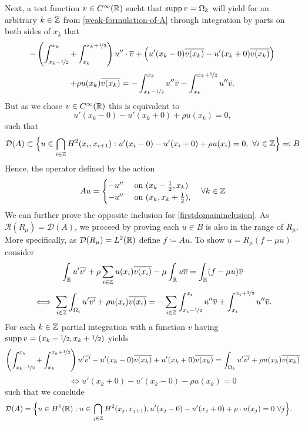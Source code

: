 Next, a test function $v \in C^{\infty}(\mathbb{R})$ sucht that $\operatorname{supp} v = \Omega_{k}$ will yield for an arbitrary $k \in \mathbb{Z}$ from \eqref{weak-formulation-of-A}   through integration by parts on both sides of $x_{k}$ that
	\[ -\left( \int_{x_{k}-\nicefrac{1}{2}}^{x_{k}} + \int_{x_{k}}^{x_{k} + \nicefrac{1}{2}}\right) u'' \cdot \overline{v} + \left( u'(x_{k}-0) \overline{v(x_{k})} - u'(x_{k} + 0) \overline{v(x_{k})} \right) \\ \]
	\[ +  \rho u(x_{k})\overline{v(x_{k})} = - \int_{x_{k} - \nicefrac{1}{2}}^{x_{k}} u'' \overline{v} - \int_{x_{k}}^{x_{k} + \nicefrac{1}{2}} u'' \overline{v}. \]
But as we chose $v \in C^{\infty}(\mathbb{R})$ this is equivalent to
	\[ u'(x_{k}-0) - u'(x_{k}+0) + \rho u(x_{k}) = 0, \]
such that
	\begin{equation}
		\mathcal{D}(A) \subset \Big\{ u \in \bigcap_{i \in \mathbb{Z}} H^{2}(x_{i}, x_{i + 1}) : u'(x_{i} - 0) - u'(x_{i} + 0) + \rho u(x_{i}) = 0 , ~\forall i \in \mathbb{Z} \Big\} \eqqcolon B \label{firstdomaininclusion}
	\end{equation} 
Hence, the operator defined by the action
	\[ A u = \begin{cases}
					- u'' & \text{ on } (x_{k} - \frac{1}{2}, x_{k}) \\
					- u'' & \text{ on } (x_{k}, x_{k} + \frac{1}{2}),
			 \end{cases} \quad \forall k \in \mathbb{Z} \] %
We can further prove the opposite inclusion for \eqref{firstdomaininclusion}. As $\mathcal{R}(R_{\mu}) = \mathcal{D}(A)$, we proceed by proving each $u \in B$ is also in the range of $R_{\mu}$. More specifically, as $\mathcal{D}(R_{\mu}) = L^{2}(\mathbb{R})$ define $f \coloneqq A u$. To show $u = R_{\mu}(f - \mu u)$ consider %
	\[ \int_{\mathbb{R}} u' \overline{v'} + \rho \sum_{i \in \mathbb{Z}} u(x_{i}) \overline{v(x_{i})} - \mu \int_{\mathbb{R}} u \overline{v}= \int_{\mathbb{R}}(f-\mu u) \overline{v} \]
	\[ \iff \sum_{i \in \mathbb{Z}} \int_{\Omega_{i}} u' \overline{v'} + \rho u(x_{i}) \overline{v(x_{i})} = - \sum_{i \in \mathbb{Z}} \int_{x_{i} - \nicefrac{1}{2}}^{x_{i}} u'' \overline{v} + \int_{x_{i}}^{x_{i} + \nicefrac{1}{2}} u'' \overline{v}. \]
	For each $k \in \mathbb{Z}$ partial integration with a function $v$ having $\operatorname{supp} v = (x_{k} - \nicefrac{1}{2}, x_{k} + \nicefrac{1}{2})$ yields
	\[ \left( \int_{x_{k} - \nicefrac{1}{2}}^{x_{k}} + \int_{x_{k}}^{x_{k} +\nicefrac{1}{2}} \right) u' \overline{v'} - u'(x_{k}-0) \overline{v(x_{k})}  + u'(x_{k}+0) \overline{v(x_{k})}  = \int_{\Omega_{k}} u' \overline{v'} + \rho u(x_{k}) \overline{v(x_{k})} \]
	\[ \iff u'(x_{k}+0) - u'(x_{k}-0) - \rho u(x_{k}) = 0 \]
	such that we conclude
	\begin{align*}
		\mathcal{D}(A) & = \Big\{ u \in H^{1}(\mathbb{R}): u \in \bigcap_{j \in \mathbb{Z}} H^{2}(x_{j} , x_{j+1}), u'(x_{j} - 0) - u'(x_{j} + 0) + \rho \cdot u(x_{j}) = 0 ~\forall j \Big\}.
	\end{align*}

